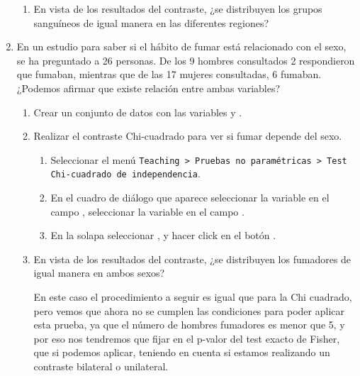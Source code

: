 \begin{enumerate}[leftmargin=*]
\begin{enumerate}
\item En vista de los resultados del contraste, ¿se distribuyen los grupos sanguíneos de igual manera en las diferentes
regiones?
\end{enumerate}

\item En un estudio para saber si el hábito de fumar está relacionado con el sexo, se ha preguntado a 26 personas. De
los 9 hombres consultados 2 respondieron que fumaban, mientras que de las 17 mujeres consultadas, 6 fumaban. ¿Podemos
afirmar que existe relación entre ambas variables?
\begin{enumerate}
\item Crear un conjunto de datos con las variables  y .

\item Realizar el contraste Chi-cuadrado para ver si fumar depende del sexo.  
\begin{indicacion}
\begin{enumerate}
\item Seleccionar el menú \texttt{Teaching > Pruebas no paramétricas > Test Chi-cuadrado de independencia}.
\item En el cuadro de diálogo que aparece seleccionar la variable  en el campo , seleccionar la variable  en el campo .
\item En la solapa  seleccionar , y hacer click en el
botón .
\end{enumerate}
\end{indicacion}


\item En vista de los resultados del contraste, ¿se distribuyen los fumadores de igual manera en ambos sexos?
\begin{indicacion} En este caso el procedimiento a seguir es igual que para la Chi cuadrado, pero vemos que ahora no se
cumplen las condiciones para poder aplicar esta prueba, ya que el número de hombres fumadores es menor que 5, y por eso
nos tendremos que fijar en el p-valor del test exacto de Fisher, que si podemos aplicar, teniendo en cuenta si estamos
realizando un contraste bilateral o unilateral.
\end{indicacion}
\end{enumerate}



\end{enumerate}
